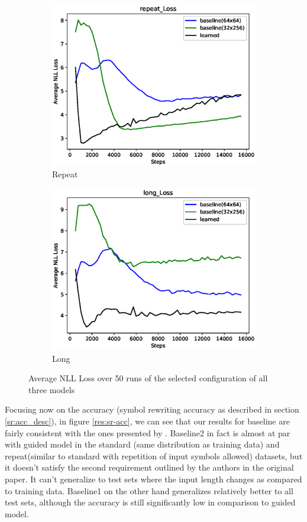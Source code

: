 \begin{figure}[ht]
\begin{subfigure}{0.5\linewidth}
		\includegraphics[width=0.95\linewidth]{./figs/sr/repeat-loss-eps}
		\caption{Repeat}\label{repeat-loss}
	\end{subfigure}
	\begin{subfigure}{0.5\linewidth}
		\includegraphics[width=0.95\linewidth]{./figs/sr/long-loss-eps}
		\caption{Long}\label{long-loss}
	\end{subfigure}
	\caption{Average NLL Loss over 50 runs of the selected configuration of all three models}\label{sr-all-loss}
\end{figure}

Focusing now on the accuracy (symbol rewriting accuracy as described in section \ref{sr:acc_desc}), in figure \ref{res:sr-acc}, we can see that our results for baseline are fairly consistent with the ones presented by \cite{Weber2018}. Baseline2 in fact is almost at par with guided model in the standard (same distribution as training data) and repeat(similar to standard with repetition of input symbols allowed) datasets, but it doesn't satisfy the second requirement outlined by the authors in the original paper. It can't generalize to test sets where the input length changes as compared to training data. Baseline1 on the other hand generalizes relatively better to all test sets, although the accuracy is still significantly low in comparison to guided model.


